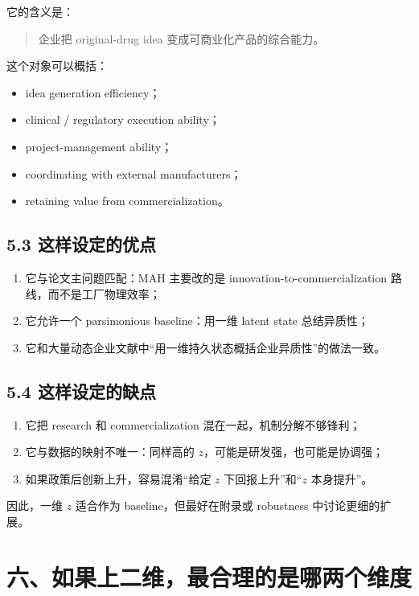 \documentclass[12pt,fontset=none]{ctexart}
\begin{document}
它的含义是：

\begin{quote}
企业把 original-drug idea 变成可商业化产品的综合能力。
\end{quote}

这个对象可以概括：

\begin{itemize}[leftmargin=2em]
    \item idea generation efficiency；
    \item clinical / regulatory execution ability；
    \item project-management ability；
    \item coordinating with external manufacturers；
    \item retaining value from commercialization。
\end{itemize}

\subsection{5.3 这样设定的优点}

\begin{enumerate}[leftmargin=2em]
    \item 它与论文主问题匹配：MAH 主要改的是 innovation-to-commercialization 路线，而不是工厂物理效率；
    \item 它允许一个 parsimonious baseline：用一维 latent state 总结异质性；
    \item 它和大量动态企业文献中“用一维持久状态概括企业异质性”的做法一致。
\end{enumerate}

\subsection{5.4 这样设定的缺点}

\begin{enumerate}[leftmargin=2em]
    \item 它把 research 和 commercialization 混在一起，机制分解不够锋利；
    \item 它与数据的映射不唯一：同样高的 \(z\)，可能是研发强，也可能是协调强；
    \item 如果政策后创新上升，容易混淆“给定 \(z\) 下回报上升”和“\(z\) 本身提升”。
\end{enumerate}

因此，一维 \(z\) 适合作为 baseline，但最好在附录或 robustness 中讨论更细的扩展。

\section{六、如果上二维，最合理的是哪两个维度}
\end{document}
